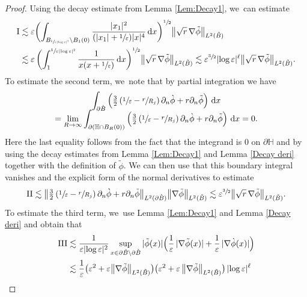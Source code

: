 \documentclass[JEP,XML,SOM,Unicode,published]{cedram}
\let\epsilon\varepsilon
\let\backslash\setminus
\newcommand{\rI}{\mathrm{I}}
\newcommand{\rII}{\mathrm{II}}
\newcommand{\rIII}{\mathrm{III}}
\theoremstyle{definition}
\newcommand\bnorm[1]{\bigl\lVert #1\bigr\rVert}
\newcommand\eq{=}
\newcommand\dd{\,\mathrm{d}}
\newcommand\dx{\dd x}
\let\de\partial
\let\eps\epsilon
\let\mel\relax
\begin{document}
\begin{proof}
Using the decay estimate from Lemma \ref{Lem:Decay1}, we~can estimate\vspace*{-3pt}
\begin{align*}
\mel \rI&\lesssim \eps\biggl(\int_{B_{\sfrac{1}{\eps|{\log\eps}|^2}}\backslash B_1(0)}\frac{|x_1|^2}{(|x_1|+\sfrac{1}{\eps})|x|^4}\dx \biggr)^{\sfrac{1}{2}}\bnorm{\sqrt{r}\,\nabla\tilde{\phi}}_{L^2(\tilde{B})}\\
&\lesssim \eps\, \biggl(\int_{1}^{\sfrac{1}{\eps|{\log\eps}|^2}}
\frac{1}{x(x+\sfrac{1}{\eps})}\dx\biggr)^{\sfrac{1}{2}}
\bnorm{\sqrt{r}\,\nabla\tilde{\phi}}_{L^2(\tilde{B})}\lesssim \eps^{\sfrac{3}{2}}
|{\log\eps}|^\ell\bnorm{\sqrt{r}\,\nabla\tilde{\phi}}_{L^2(\tilde{B})}.
\end{align*}
To estimate the second term, we~note that by partial integration we have\vspace*{-5pt}
\begin{multline*}
\int_{\de\grave{B}}\left(\tfrac{3}{2}\left(\sfrac{1}{\eps}-\sfrac{r}{R_j}\right)\de_n\grave{\phi}+r\de_n\tilde{\phi}\right)\dx\\[-5pt]
\eq \lim_{R\to \infty}\int_{\de \left(\mathbb{H}\cap B_R(0)\right)}\left(\tfrac{3}{2}\left(\sfrac{1}{\eps}-\sfrac{r}{R_j}\right)\de_n\grave{\phi}+r\de_n\tilde{\phi}\right)\dx\eq0.
\end{multline*}
Here the last equality follows from the fact that the integrand is $0$ on $\de\mathbb{H}$ and by using the decay estimates from Lemma \ref{Lem:Decay1} and Lemma \ref{Decay deri} together with the definition of $\tilde{\phi}$.
We can then use that this boundary integral vanishes and the explicit form of the normal derivatives to estimate\vspace*{-3pt}
\begin{align*}
\rII\lesssim \bnorm{\tfrac{3}{2}\left(\sfrac{1}{\eps}-\sfrac{r}{R_j}\right)\de_n\grave{\phi}+r\de_n\tilde{\phi}}_{L^2(\de\grave{B})}\bnorm{\nabla\tilde{\phi}}_{L^2(\tilde{B})}\lesssim \eps^{\sfrac{3}{2}}\bnorm{\sqrt{r}\,\nabla\tilde{\phi}}_{L^2(\tilde{B})}.
\end{align*}
To estimate the third term, we~use Lemma \ref{Lem:Decay1} and Lemma \ref{Decay deri} and obtain that\vspace*{-3pt}
\begin{align*}
\mel \rIII&\lesssim \frac{1}{\eps|{\log\eps}|^2}\sup_{x\in \de\tilde{B}\backslash\de\grave{B}}|\tilde{\phi}(x)|\Bigl(\frac{1}{\eps}\,|\nabla\tilde{\phi}(x)|+\frac{1}{\eps}\,|\nabla\grave{\phi}(x)|\Bigr)\\
&\lesssim\frac{1}{\eps} \bigl(\eps^2+\eps\bnorm{\nabla\tilde{\phi}}_{L^2(\tilde{B})}\bigl)\bigl(\eps^2+\eps\,\bnorm{\nabla\tilde{\phi}}_{L^2(\tilde{B})}\bigr)\,|{\log\eps}|^\ell\\

\end{align*}
\end{proof}
\end{document}
